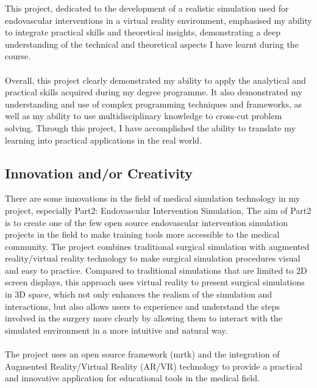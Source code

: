 \documentclass[12pt]{article}
\begin{document}
This project, dedicated to the development of a realistic simulation used for endovascular interventions in a virtual reality environment, emphasised my ability to integrate practical skills and theoretical insights, demonstrating a deep understanding of the technical and theoretical aspects I have learnt during the course.
\\\\
Overall, this project clearly demonstrated my ability to apply the analytical and practical skills acquired during my degree programme. It also demonstrated my understanding and use of complex programming techniques and frameworks, as well as my ability to use multidisciplinary knowledge to cross-cut problem solving. Through this project, I have accomplished the ability to translate my learning into practical applications in the real world.



\subsection{Innovation and/or Creativity}
There are some innovations in the field of medical simulation technology in my project, especially Part2: Endovascular Intervention Simulation, The aim of Part2 is to create one of the few open source endovascular intervention simulation projects in the field to make training tools more accessible to the medical community. The project combines traditional surgical simulation with augmented reality/virtual reality technology to make surgical simulation procedures visual and easy to practice. Compared to traditional simulations that are limited to 2D screen displays, this approach uses virtual reality to present surgical simulations in 3D space, which not only enhances the realism of the simulation and interactions, but also allows users to experience and understand the steps involved in the surgery more clearly by allowing them to interact with the simulated environment in a more intuitive and natural way.
\\\\
The project uses an open source framework (\gls{mrtk}) and the integration of Augmented Reality/Virtual Reality (AR/VR) technology to provide a practical and innovative application for educational tools in the medical field.
\end{document}
